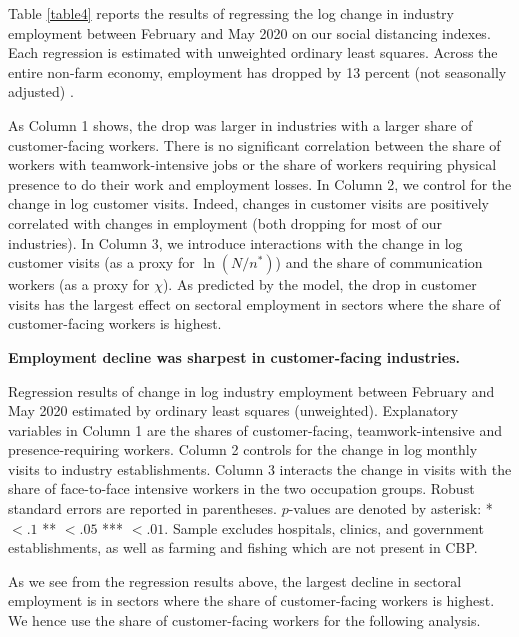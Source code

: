 \documentclass[10pt,letterpaper]{article}
\begin{document}
Table \ref{table4} reports the results of regressing the log change in industry employment between February and May 2020 on our social distancing indexes. Each regression is estimated with unweighted ordinary least squares. Across the entire non-farm economy, employment has dropped by 13 percent (not seasonally adjusted) \cite{CES}. 

As Column 1 shows, the drop was larger in industries with a larger share of customer-facing workers. There is no significant correlation between the share of workers with teamwork-intensive jobs or the share of workers requiring physical presence to do their work and employment losses. In Column 2, we control for the change in log customer visits. Indeed, changes in customer visits are positively correlated with changes in employment (both dropping for most of our industries).  In Column 3, we introduce interactions with the change in log customer visits (as a proxy for $\ln (N/n^*)$) and the share of communication workers (as a proxy for $\chi$). As predicted by the model, the drop in customer visits has the largest effect on sectoral employment in sectors where the share of customer-facing workers is highest.
 
\begin{table}[!ht]
\caption{
{\bf Employment decline was sharpest in customer-facing industries.}}

\begin{flushleft} Regression results of change in log industry employment between February and May 2020 estimated by ordinary least squares (unweighted). Explanatory variables in Column 1 are the shares of customer-facing, teamwork-intensive and presence-requiring workers. Column 2 controls for the change in log monthly visits to industry establishments. Column 3 interacts the change in visits with the share of face-to-face intensive  workers in the two occupation groups. Robust standard errors are reported in parentheses. $p$-values are denoted by asterisk: * $<.1$ ** $<.05$ *** $<.01$.
Sample excludes hospitals, clinics, and government establishments, as well as farming and fishing which are not present in CBP.
\end{flushleft}
\label{table4}
\end{table}


As we see from the regression results above, the largest decline in sectoral employment is in sectors where the share of customer-facing workers is highest. We hence use the share of customer-facing workers for the following analysis. 
\end{document}
